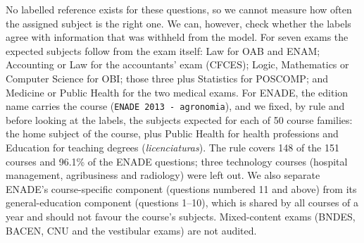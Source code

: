 No labelled reference exists for these questions, so we cannot measure how
often the assigned subject is the right one. We can, however, check whether
the labels agree with information that was withheld from the model. For seven
exams the expected subjects follow from the exam itself: Law for OAB and
ENAM; Accounting or Law for the accountants' exam (CFCES); Logic, Mathematics
or Computer Science for OBI; those three plus Statistics for POSCOMP; and
Medicine or Public Health for the two medical exams. For ENADE, the edition
name carries the course (\texttt{ENADE 2013 - agronomia}), and we fixed, by
rule and before looking at the labels, the subjects expected for each of 50
course families: the home subject of the course, plus Public Health for
health professions and Education for teaching degrees
(\emph{licenciaturas}). The rule covers 148 of the 151 courses and 96.1\% of
the ENADE questions; three technology courses (hospital management,
agribusiness and radiology) were left out. We also separate ENADE's
course-specific component (questions numbered 11 and above) from its
general-education component (questions 1--10), which is shared by all courses
of a year and should not favour the course's subjects. Mixed-content exams
(BNDES, BACEN, CNU and the vestibular exams) are not audited.

